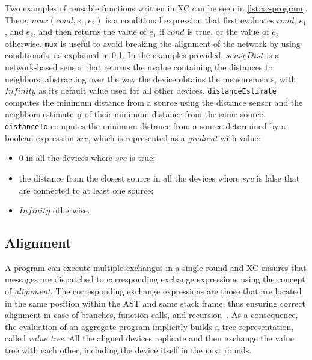Two examples of reusable functions written in \ac{XC} can be seen in \cref{lst:xc-program}.
%
There, $mux(cond, e_1, e_2)$ is a conditional expression that first evaluates $cond$, $e_1$, and $e_2$, and then returns the value of $e_1$ if $cond$ is true, or the value of $e_2$ otherwise.
%
\texttt{mux} is useful to avoid breaking the alignment of the network by using conditionals, as explained in \cref{chap:background->sec:xc->subsec:alignment}.
%
In the examples provided, $\underline{senseDist}$ is a network-based sensor that returns the nvalue containing the distances to neighbors, abstracting over the way the device obtains the measurements, with $Infinity$ as its default value used for all other devices.
%
\texttt{distanceEstimate} computes the minimum distance from a source using the distance sensor and the neighbors estimate $\underline{\mathbf{n}}$ of their minimum distance from the same source.
%
\texttt{distanceTo} computes the minimum distance from a source determined by a boolean expression $src$, which is represented as a \textit{gradient} with value:
\begin{itemize}
    \item $0$ in all the devices where $src$ is true;
    \item the distance from the closest source in all the devices where $src$ is false that are connected to at least one source;
    \item $Infinity$ otherwise.
\end{itemize}



\subsection{Alignment}\label{chap:background->sec:xc->subsec:alignment}

A program can execute multiple exchanges in a single round and \ac{XC} ensures that messages are dispatched to corresponding exchange expressions using the concept of \textit{alignment}.
%
The corresponding exchange expressions are those that are located in the same position within the \ac{AST} and same stack frame, thus ensuring correct alignment in case of branches, function calls, and recursion~\cite{xc}.
%
As a consequence, the evaluation of an aggregate program implicitly builds a tree representation, called \textit{value tree}.
%
All the aligned devices replicate and then exchange the value tree with each other, including the device itself in the next rounds.

